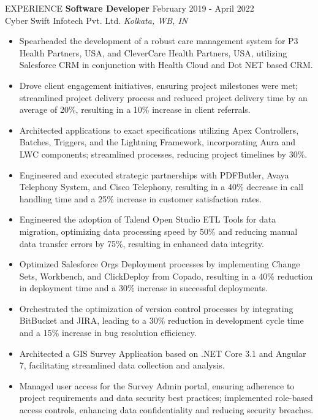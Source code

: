 \documentclass[11pt]{resume}
\begin{document}
\begin{rSection}{EXPERIENCE}
        \textbf{Software Developer} \hfill February 2019 - April 2022\\
        Cyber Swift Infotech Pvt. Ltd. \hfill \textit{Kolkata, WB, IN}
        \begin{itemize}
            \itemsep -3pt {}
            \item Spearheaded the development of a robust care management system for P3 Health Partners, USA, and CleverCare Health Partners, USA, utilizing Salesforce CRM in conjunction with Health Cloud and Dot NET based CRM.
            \item Drove client engagement initiatives, ensuring project milestones were met; streamlined project delivery process and reduced project delivery time by an average of 20\%, resulting in a 10\% increase in client referrals.
            \item Architected applications to exact specifications utilizing Apex Controllers, Batches, Triggers, and the Lightning Framework, incorporating Aura and LWC components; streamlined processes, reducing project timelines by 30\%.
            \item Engineered and executed strategic partnerships with PDFButler, Avaya Telephony System, and Cisco Telephony, resulting in a 40\% decrease in call handling time and a 25\% increase in customer satisfaction rates.
            \item Engineered the adoption of Talend Open Studio ETL Tools for data migration, optimizing data processing speed by 50\% and reducing manual data transfer errors by 75\%, resulting in enhanced data integrity.
            \item Optimized Salesforce Orgs Deployment processes by implementing Change Sets, Workbench, and ClickDeploy from Copado, resulting in a 40\% reduction in deployment time and a 30\% increase in successful deployments.
            \item Orchestrated the optimization of version control processes by integrating BitBucket and JIRA, leading to a 30\% reduction in development cycle time and a 15\% increase in bug resolution efficiency.
            \item Architected a GIS Survey Application based on .NET Core 3.1 and Angular 7, facilitating streamlined data collection and analysis.
            \item Managed user access for the Survey Admin portal, ensuring adherence to project requirements and data security best practices; implemented role-based access controls, enhancing data confidentiality and reducing security breaches.

\end{itemize}
\end{rSection}
\end{document}
